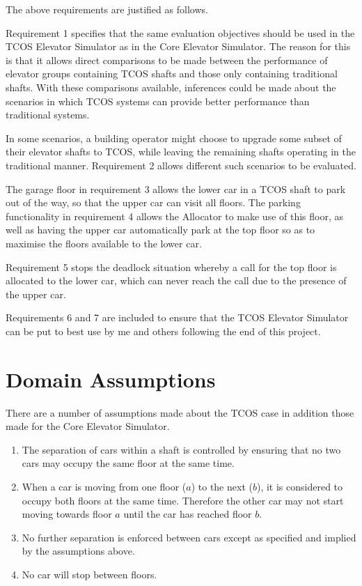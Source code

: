 \documentclass{UoYCSproject}
\begin{document}
The above requirements are justified as follows.

Requirement 1 specifies that the same evaluation objectives should be used in the TCOS Elevator Simulator as in the Core Elevator Simulator.  The reason for this is that it allows direct comparisons to be made between the performance of elevator groups containing TCOS shafts and those only containing traditional shafts.  With these comparisons available, inferences could be made about the scenarios in which TCOS systems can provide better performance than traditional systems.

In some scenarios, a building operator might choose to upgrade some subset of their elevator shafts to TCOS, while leaving the remaining shafts operating in the traditional manner.  Requirement 2 allows different such scenarios to be evaluated.

The garage floor in requirement 3 allows the lower car in a TCOS shaft to park out of the way, so that the upper car can visit all floors.  The parking functionality in requirement 4 allows the Allocator to make use of this floor, as well as having the upper car automatically park at the top floor so as to maximise the floors available to the lower car.

Requirement 5 stops the deadlock situation whereby a call for the top floor is allocated to the lower car, which can never reach the call due to the presence of the upper car.

Requirements 6 and 7 are included to ensure that the TCOS Elevator Simulator can be put to best use by me and others following the end of this project.

\section{Domain Assumptions}

There are a number of assumptions made about the TCOS case in addition those made for the Core Elevator Simulator.
	\begin{enumerate}
		\item The separation of cars within a shaft is controlled by ensuring that no two cars may occupy the same floor at the same time.
		\item When a car is moving from one floor ($a$) to the next ($b$), it is considered to occupy both floors at the same time.  Therefore the other car may not start moving towards floor $a$ until the car has reached floor $b$.
		\item No further separation is enforced between cars except as specified and implied by the assumptions above.
		\item No car will stop between floors.
	\end{enumerate}
\end{document}
